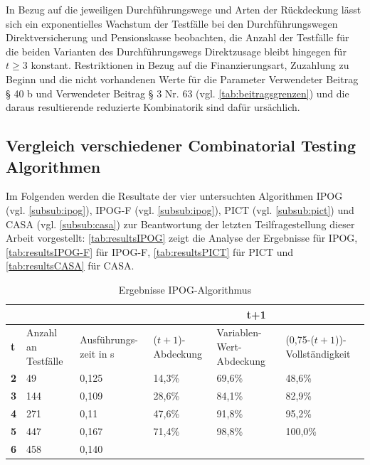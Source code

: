 In Bezug auf die jeweiligen Durchführungswege und Arten der Rückdeckung lässt sich ein exponentielles Wachstum der Testfälle bei den Durchführungswegen Direktversicherung und Pensionskasse beobachten, die Anzahl der Testfälle für die beiden Varianten des Durchführungswegs Direktzusage bleibt hingegen für $t\geq 3$ konstant. Restriktionen in Bezug auf die Finanzierungsart, Zuzahlung zu Beginn und die nicht vorhandenen Werte für die Parameter Verwendeter Beitrag § 40 b und Verwendeter Beitrag § 3 Nr. 63 (vgl. \autoref{tab:beitragsgrenzen}) und die daraus resultierende reduzierte Kombinatorik sind dafür ursächlich. 

\subsection{Vergleich verschiedener Combinatorial Testing Algorithmen}\label{subsec:resultsTools}

Im Folgenden werden die Resultate der vier untersuchten Algorithmen IPOG  (vgl. \autoref{subsub:ipog}), IPOG-F (vgl. \autoref{subsub:ipog}), PICT (vgl. \autoref{subsub:pict}) und CASA (vgl. \autoref{subsub:casa}) zur Beantwortung der letzten Teilfragestellung dieser Arbeit vorgestellt: \autoref{tab:resultsIPOG} zeigt die Analyse der Ergebnisse für IPOG, \autoref{tab:resultsIPOG-F} für IPOG-F, \autoref{tab:resultsPICT} für PICT und \autoref{tab:resultsCASA} für CASA.

\begin{table}[!b]
\footnotesize
\begin{tabular}{|M{0.06\textwidth}|M{}|M{}||M{}|M{}|M{}|}
\hline
  &     &       &                                             \\ \hline
\textbf{t} & Anzahl an Testfälle & Ausführungs- zeit in s & ($t+1$)-Abdeckung & Variablen-Wert-Abdeckung & (0,75-($t+1$))-Vollständigkeit \\ \hline
\textbf{2} & 49  & 0,125 & 14,3\% & 69,6\% & 48,6\%  \\
\textbf{3} & 144 & 0,109 & 28,6\% & 84,1\% & 82,9\%  \\
\textbf{4} & 271 & 0,11  & 47,6\% & 91,8\% & 95,2\%  \\
\textbf{5} & 447 & 0,167 & 71,4\% & 98,8\% & 100,0\% \\
\textbf{6} & 458 & 0,140  &        &      &         \\ \hline
\end{tabular}
\normalsize
\caption{Ergebnisse IPOG-Algorithmus}
\label{tab:resultsIPOG}
\end{table}

